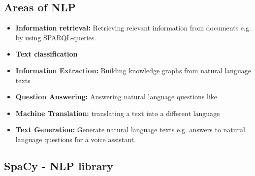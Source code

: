 \subsection{Areas of NLP}

\begin{itemize}
    \item \textbf{Information retrieval:} Retrieving relevant information from documents e.g. by using SPARQL-queries.
    \item \textbf{Text classification}
    \item \textbf{Information Extraction:} Building knowledge graphs from natural language texts
    \item \textbf{Question Answering:} Answering natural language questions like 
    \item \textbf{Machine Translation:} translating a text into a different language
    \item \textbf{Text Generation:} Generate natural language texts e.g. answers to natural language questions for a voice assistant.
\end{itemize}

\subsection{SpaCy - NLP library}

